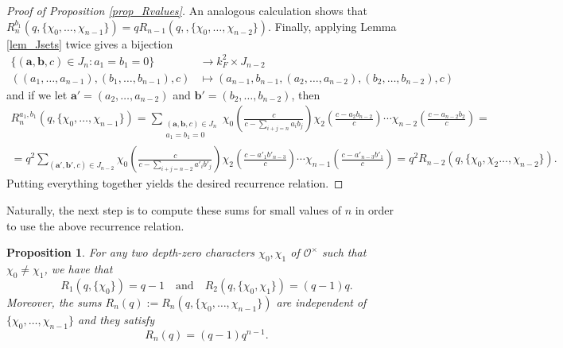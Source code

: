 \documentclass{article}
\newcommand{\cO}{\mathcal{O}}
\theoremstyle{plain}
\newtheorem{proposition}[theorem]{Proposition}
\theoremstyle{definition}
\begin{document}
\begin{proof}[Proof of Proposition \ref{prop_Rvalues}]
        An analogous calculation shows that $R_n^{b_1}(q,\{\chi_0,\ldots,\chi_{n-1}\})=qR_{n-1}(q,,\{\chi_0,\ldots,\chi_{n-2}\})$. Finally, applying Lemma \ref{lem_Jsets} twice gives a bijection 
        \begin{align*}
            \{(\mathbf{a},\mathbf{b},c)\in J_n:a_1=b_1=0\}&\longrightarrow k_F^2\times J_{n-2}\\
            ((a_1,\ldots,a_{n-1}),(b_1,\ldots,b_{n-1}),c)&\longmapsto (a_{n-1},b_{n-1},(a_2,\ldots,a_{n-2}),(b_2,\ldots,b_{n-2}),c)
        \end{align*}
        and if we let $\mathbf{a}'=(a_2,\ldots,a_{n-2})$ and $\mathbf{b}'=(b_2,\ldots,b_{n-2})$, then
        \begin{align*}
            R_n^{a_1,b_1}(q,\{\chi_0,\ldots,\chi_{n-1}\})=\sum_{\substack{(\mathbf{a},\mathbf{b},c)\in J_n\\ a_1=b_1=0}}\chi_0\left(\frac{c}{c-\sum_{i+j=n}a_ib_j}\right)\chi_2\left(\frac{c-a_2b_{n-2}}{c}\right)%
            \cdots\chi_{n-2}\left(\frac{c-a_{n-2}b_2}{c}\right)=\\
            =q^2\sum_{(\mathbf{a}',\mathbf{b}',c)\in J_{n-2}}\chi_0\left(\frac{c}{c-\sum_{i+j=n-2}a'_ib'_j}\right)\chi_2\left(\frac{c-a'_1b'_{n-3}}{c}\right)%
            \cdots\chi_{n-1}\left(\frac{c-a'_{n-3}b'_1}{c}\right)=q^2R_{n-2}(q,\{\chi_0,\chi_2\ldots,\chi_{n-2}\}).
        \end{align*}
        Putting everything together yields the desired recurrence relation.
    \end{proof}

    Naturally, the next step is to compute these sums for small values of $n$ in order to use the above recurrence relation.

    \begin{proposition}
        For any two depth-zero characters $\chi_0,\chi_1$ of $\cO^\times$ such that $\chi_0\neq\chi_1$, we have that 
        \begin{equation}\label{eqn_Rinitial}
            R_1(q,\{\chi_0\})=q-1\quad\text{and}\quad R_2(q,\{\chi_0,\chi_1\})=(q-1)q.
        \end{equation}
        Moreover, the sums $R_n(q):=R_n(q,\{\chi_0,\ldots,\chi_{n-1}\})$ are independent of $\{\chi_0,\ldots,\chi_{n-1}\}$ and they satisfy $$R_n(q)=(q-1)q^{n-1}.$$
    \end{proposition}
\end{document}
